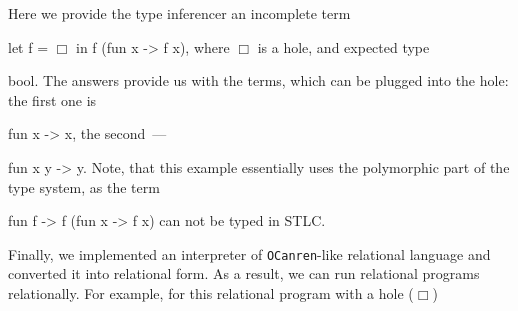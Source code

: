 \documentclass[10pt, oneside, nocopyrightspace]{sigplanconf}
\newcommand{\OCanren}{\texttt{OCanren}\xspace}
\newcommand*{\SavedLstInline}{}
\DeclareRobustCommand*{\lstinline}{%
  \ifmmode
    \let\SavedBGroup\bgroup
    \def\bgroup{%
      \let\bgroup\SavedBGroup
      \hbox\bgroup
    }%
  \fi
  \SavedLstInline
}
\begin{document}
Here we provide the type inferencer an incomplete term \lstinline{let f = $\Box$ in f (fun x -> f x)}, where $\Box$ is a hole, 
and expected type \lstinline{bool}. The answers provide us with the terms, which can be plugged into the hole: the first one 
is \lstinline{fun x -> x}, the second~--- \lstinline{fun x y -> y}. Note, that this example essentially uses the polymorphic
part of the type system, as the term \lstinline{fun f -> f (fun x -> f x)} can not be typed in STLC.


\begin{comment}
\item Проверка населенности типа с помощью генерации термов, которые имеют данный тип.
\begin{lstlisting}[language=ocaml,mathescape=true,numberstyle=\small,stepnumber=1,numbersep=-5pt]
run (q) 5 (nat_type_inference ((===) q) (Just TBool))

==> {
q=Lit (LBool _.24); 
q=Let (_.18, Lit (LInt _.32), Lit (LBool _.80)); 
q=Let (_.18, Lit (LBool _.32), Lit (LBool _.80)); 
q=Let (_.89, Lit (LBool _.32), Var _.89); 
q=Let (_.18, Abst (_.26, Lit LInt (_.48)), Lit (LBool _.149)); 
}
\end{lstlisting}
\item Достраивание неполного терма. Имеется терм с дыркой \linebreak  В результате получаются различные термы (например, $lambda x. x$), которые можно подставить на место дырки, чтобы полученный терм типизировался заданным типом.
\begin{lstlisting}[language=ocaml,mathescape=true,numberstyle=\small,stepnumber=1,numbersep=-5pt]
run (q) 5 
  nat_type_inference 
    (Let ("f", q, App(Var "f", Abst("x", App(Var "f", Var "x"))))) 
    (Just TBool))

==> {
q=Abst (_.74, Var (_.74)); 
q=Abst (_.44, Abst (_.90, Var (_.90))); 
q=Let (_.44, Lit (LInt (_.58)), Abst (_.130, Var (_.130))); 
q=Abst (_.231 [=/= _.218], 
    Let (_.218, Lit (LInt (_.74)), Var (_.231 [=/= _.218]))); 
q=Let (_.44, Lit (LBool (_.58)), Abst (_.130, Var (_.130)));  
}
\end{lstlisting}
\end{itemize}
\end{comment}

Finally, we implemented an interpreter of \OCanren-like relational language and converted it into relational form. As a result, 
we can run relational programs relationally. For example, for this relational program with a hole ($\Box$) 
\end{document}

